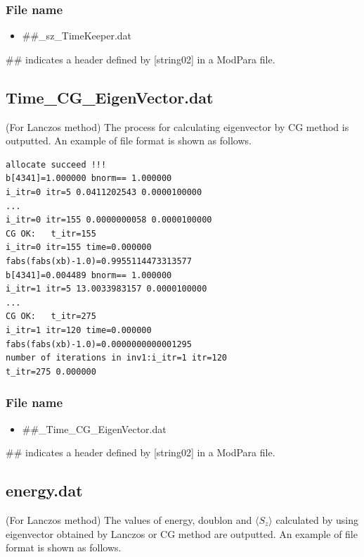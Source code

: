 \subsubsection{File name}
 \begin{itemize}
   \item  \#\#\_sz\_TimeKeeper.dat
 \end{itemize}
 \#\# indicates a header defined by [string02] in a ModPara file.
 
\newpage
\subsection{Time\_CG\_EigenVector.dat}
\label{Subsec:timecgeigenv}
(For Lanczos method) The process for calculating eigenvector by CG method is outputted.
An example of file format is shown as follows.

\begin{minipage}{12.5cm}
\begin{screen}
\begin{verbatim}
allocate succeed !!! 
b[4341]=1.000000 bnorm== 1.000000 
i_itr=0 itr=5 0.0411202543 0.0000100000 
...
i_itr=0 itr=155 0.0000000058 0.0000100000 
CG OK:   t_itr=155 
i_itr=0 itr=155 time=0.000000  
fabs(fabs(xb)-1.0)=0.9955114473313577
b[4341]=0.004489 bnorm== 1.000000 
i_itr=1 itr=5 13.0033983157 0.0000100000 
...
CG OK:   t_itr=275 
i_itr=1 itr=120 time=0.000000  
fabs(fabs(xb)-1.0)=0.0000000000001295
number of iterations in inv1:i_itr=1 itr=120 
t_itr=275 0.000000
\end{verbatim}
\end{screen}
\end{minipage}

\subsubsection{File name}
 \begin{itemize}
   \item  \#\#\_Time\_CG\_EigenVector.dat
 \end{itemize}
 \#\# indicates a header defined by [string02] in a ModPara file.

\newpage
\subsection{energy.dat}
\label{subsec:energy.dat}
(For Lanczos method) The values of energy, doublon and $\langle S_z \rangle$ calculated by using eigenvector obtained by Lanczos or CG method are outputted.
An example of file format is shown as follows.\\

